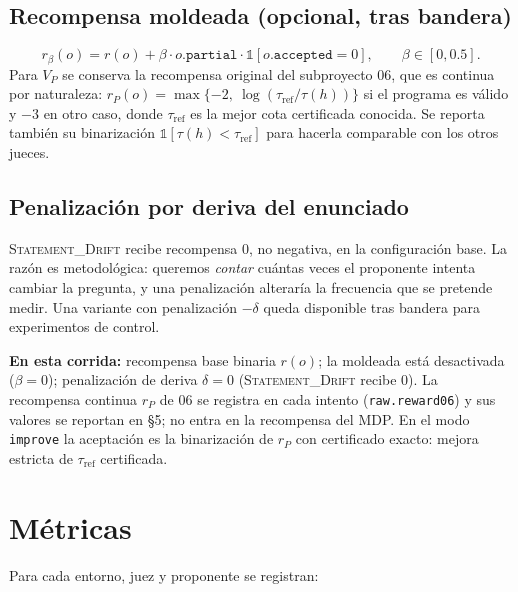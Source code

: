 \documentclass[11pt,a4paper]{article}
\begin{document}
\subsection{Recompensa moldeada (opcional, tras bandera)}
\[
  r_\beta(o) = r(o) + \beta \cdot o.\texttt{partial} \cdot \mathbb{1}[o.\texttt{accepted}=0],\qquad \beta \in [0, 0.5].
\]
Para $V_P$ se conserva la recompensa original del subproyecto 06, que es continua por naturaleza: $r_P(o) = \max\{-2,\ \log(\tau_{\mathrm{ref}}/\tau(h))\}$ si el programa es válido y $-3$ en otro caso, donde $\tau_{\mathrm{ref}}$ es la mejor cota certificada conocida. Se reporta también su binarización $\mathbb{1}[\tau(h) < \tau_{\mathrm{ref}}]$ para hacerla comparable con los otros jueces.

\subsection{Penalización por deriva del enunciado}
\textsc{Statement\_Drift} recibe recompensa $0$, no negativa, en la configuración base. La razón es metodológica: queremos \emph{contar} cuántas veces el proponente intenta cambiar la pregunta, y una penalización alteraría la frecuencia que se pretende medir. Una variante con penalización $-\delta$ queda disponible tras bandera para experimentos de control.

\medskip\noindent\textbf{En esta corrida:} recompensa base binaria $r(o)$; la moldeada está desactivada ($\beta = 0$); penalización de deriva $\delta = 0$ (\textsc{Statement\_Drift} recibe $0$). La recompensa continua $r_P$ de 06 se registra en cada intento (\texttt{raw.reward06}) y sus valores se reportan en §5; no entra en la recompensa del MDP. En el modo \texttt{improve} la aceptación es la binarización de $r_P$ con certificado exacto: mejora estricta de $\tau_{\mathrm{ref}}$ certificada.

\section{Métricas}



Para cada entorno, juez y proponente se registran:
\end{document}
